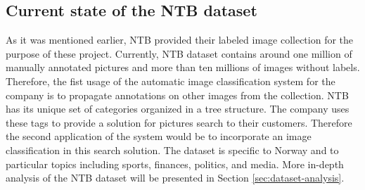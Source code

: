 \subsection{Current state of the NTB dataset}
As it was mentioned earlier, NTB provided their labeled image collection for the purpose of these project. Currently, NTB dataset contains around one million of manually annotated pictures and more than ten millions of images without labels. Therefore, the fist usage of the automatic image classification system for the company is to propagate annotations on other images from the collection. NTB has its unique set of categories organized in a tree structure. The company uses these tags to provide a solution for pictures search to their customers. Therefore the second application of the system would be to incorporate an image classification in this search solution. The dataset is specific to Norway and to particular topics including sports, finances, politics, and media. More in-depth analysis of the NTB dataset will be presented in Section \ref{sec:dataset-analysis}.

